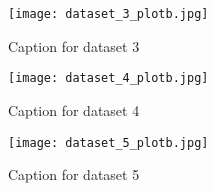 \begin{figure}[h!]
    \centering
    \texttt{[image: dataset\_3\_plotb.jpg]}
    \caption{Caption for dataset 3}
\end{figure}

\begin{figure}[h!]
    \centering
    \texttt{[image: dataset\_4\_plotb.jpg]}
    \caption{Caption for dataset 4}
\end{figure}

\begin{figure}[h!]
    \centering
    \texttt{[image: dataset\_5\_plotb.jpg]}
    \caption{Caption for dataset 5}
\end{figure}






